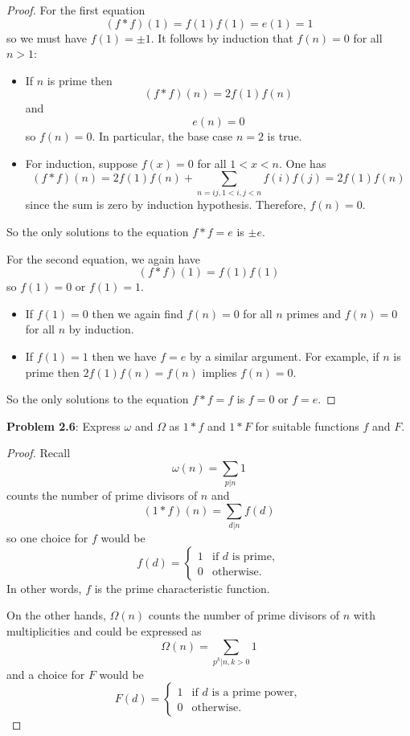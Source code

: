 \documentclass{article}
\begin{document}
\begin{proof}
For the first equation
$$(f * f)(1) = f(1) f(1) = e(1) = 1$$
so we must have $f(1) = \pm 1$. It follows by induction that $f(n) = 0$ for all $n > 1$:
\begin{itemize}
\item If $n$ is prime then
$$(f * f)(n) = 2 f(1) f(n)$$
and
$$e(n) = 0$$
so $f(n) = 0$. In particular, the base case $n = 2$ is true.
\item For induction, suppose $f(x) = 0$ for all $1 < x < n$. One has
$$(f * f)(n) = 2 f(1) f(n) + \sum_{n = i j, 1 < i, j < n} f(i) f(j) = 2 f(1) f(n)$$
since the sum is zero by induction hypothesis. Therefore, $f(n) = 0$.
\end{itemize}
So the only solutions to the equation $f * f = e$ is $\pm e$.

For the second equation, we again have
$$(f * f)(1) = f(1) f(1)$$
so $f(1) = 0$ or $f(1) = 1$.

\begin{itemize}
\item If $f(1) = 0$ then we again find $f(n) = 0$ for all $n$ primes and $f(n) = 0$ for all $n$ by induction.

\item If $f(1) = 1$ then we have $f = e$ by a similar argument. For example, if $n$ is prime then $2 f(1) f(n) = f(n)$ implies $f(n) = 0$.
\end{itemize}

So the only solutions to the equation $f * f = f$ is $f = 0$ or $f = e$.
\end{proof}

\textbf{Problem 2.6}: Express $\omega$ and $\Omega$ as $1 * f$ and $1 * F$ for suitable functions $f$ and $F$.

\begin{proof}
Recall
$$\omega(n) = \sum_{p | n} 1$$
counts the number of prime divisors of $n$ and
$$(1 * f)(n) = \sum_{d | n} f(d)$$
so one choice for $f$ would be
$$f(d) = \begin{cases}
1 &\text{if } d \text{ is prime},\\
0 &\text{otherwise}.
\end{cases}$$
In other words, $f$ is the prime characteristic function.

On the other hands, $\Omega(n)$ counts the number of prime divisors of $n$ with multiplicities and could be expressed as
$$\Omega(n) = \sum_{p^k | n, k > 0} 1$$
and a choice for $F$ would be
$$F(d) = \begin{cases}
1 &\text{if } d \text{ is a prime power},\\
0 &\text{otherwise}.
\end{cases}$$
\end{proof}
\end{document}
